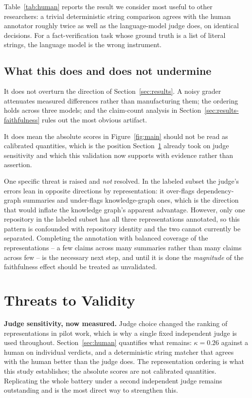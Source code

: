 \documentclass[conference]{IEEEtran}
\begin{document}
Table~\ref{tab:human} reports the result we consider most useful to other researchers: a trivial
deterministic string comparison agrees with the human annotator roughly twice as well as the
language-model judge does, on identical decisions. For a fact-verification task whose ground
truth is a list of literal strings, the language model is the wrong instrument.

\subsection{What this does and does not undermine}
\label{sec:human-implications}
It does not overturn the direction of Section~\ref{sec:results}. A noisy grader attenuates
measured differences rather than manufacturing them; the ordering holds across three models; and
the claim-count analysis in Section~\ref{sec:results-faithfulness} rules out the most obvious
artifact.

It does mean the absolute scores in Figure~\ref{fig:main} should not be read as calibrated
quantities, which is the position Section~\ref{sec:threats} already took on judge sensitivity and
which this validation now supports with evidence rather than assertion.

One specific threat is raised and \emph{not} resolved. In the labeled subset the judge's errors
lean in opposite directions by representation: it over-flags dependency-graph summaries and
under-flags knowledge-graph ones, which is the direction that would inflate the knowledge
graph's apparent advantage. However, only one repository in the labeled subset has all three
representations annotated, so this pattern is confounded with repository identity and the two
cannot currently be separated. Completing the annotation with balanced coverage of the
representations -- a few claims across many summaries rather than many claims across few -- is
the necessary next step, and until it is done the \emph{magnitude} of the faithfulness effect
should be treated as unvalidated.

\section{Threats to Validity}
\label{sec:threats}

\textbf{Judge sensitivity, now measured.} Judge choice changed the ranking of representations in
pilot work, which is why a single fixed independent judge is used throughout.
Section~\ref{sec:human} quantifies what remains: $\kappa=0.26$ against a human on individual
verdicts, and a deterministic string matcher that agrees with the human better than the judge
does. The representation ordering is what this study establishes; the absolute scores are not
calibrated quantities. Replicating the whole battery under a second independent judge remains
outstanding and is the most direct way to strengthen this.
\end{document}
